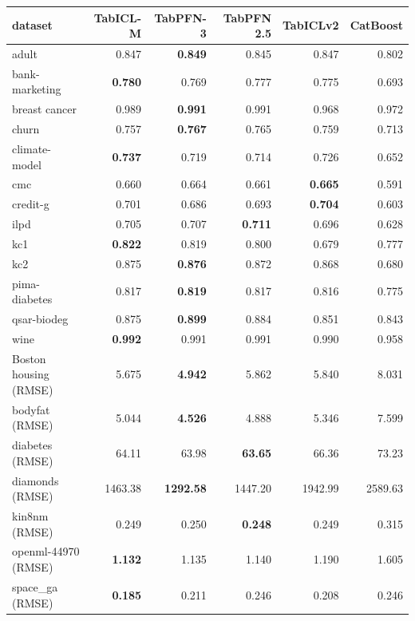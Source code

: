 \begin{tabular}{lrrrrr}
\toprule
dataset & TabICL-M & TabPFN-3 & TabPFN 2.5 & TabICLv2 & CatBoost\\
\midrule
adult & 0.847 & \textbf{0.849} & 0.845 & 0.847 & 0.802\\
bank-marketing & \textbf{0.780} & 0.769 & 0.777 & 0.775 & 0.693\\
breast cancer & 0.989 & \textbf{0.991} & 0.991 & 0.968 & 0.972\\
churn & 0.757 & \textbf{0.767} & 0.765 & 0.759 & 0.713\\
climate-model & \textbf{0.737} & 0.719 & 0.714 & 0.726 & 0.652\\
cmc & 0.660 & 0.664 & 0.661 & \textbf{0.665} & 0.591\\
credit-g & 0.701 & 0.686 & 0.693 & \textbf{0.704} & 0.603\\
ilpd & 0.705 & 0.707 & \textbf{0.711} & 0.696 & 0.628\\
kc1 & \textbf{0.822} & 0.819 & 0.800 & 0.679 & 0.777\\
kc2 & 0.875 & \textbf{0.876} & 0.872 & 0.868 & 0.680\\
pima-diabetes & 0.817 & \textbf{0.819} & 0.817 & 0.816 & 0.775\\
qsar-biodeg & 0.875 & \textbf{0.899} & 0.884 & 0.851 & 0.843\\
wine & \textbf{0.992} & 0.991 & 0.991 & 0.990 & 0.958\\
Boston housing (RMSE) & 5.675 & \textbf{4.942} & 5.862 & 5.840 & 8.031\\
bodyfat (RMSE) & 5.044 & \textbf{4.526} & 4.888 & 5.346 & 7.599\\
diabetes (RMSE) & 64.11 & 63.98 & \textbf{63.65} & 66.36 & 73.23\\
diamonds (RMSE) & 1463.38 & \textbf{1292.58} & 1447.20 & 1942.99 & 2589.63\\
kin8nm (RMSE) & 0.249 & 0.250 & \textbf{0.248} & 0.249 & 0.315\\
openml-44970 (RMSE) & \textbf{1.132} & 1.135 & 1.140 & 1.190 & 1.605\\
space\_ga (RMSE) & \textbf{0.185} & 0.211 & 0.246 & 0.208 & 0.246\\
\bottomrule
\end{tabular}
